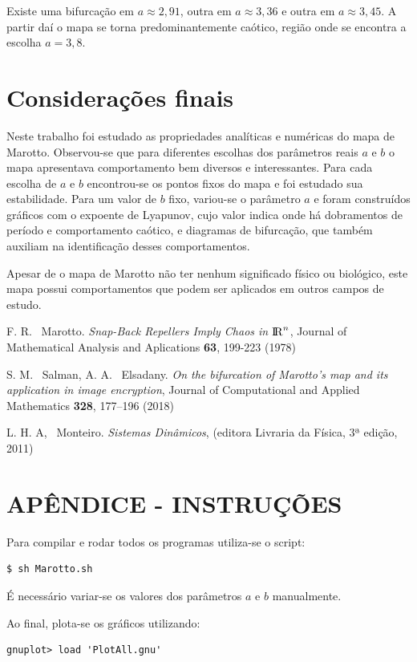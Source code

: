 \documentclass[brazilian, 12pt, a4paper, final]{article}
\begin{document}
\begin{multicols*}{2}
Existe uma bifurcação em $a\approx2,91$, outra em $a\approx3,36$ e outra em $a\approx3,45$. A partir daí o mapa se torna predominantemente caótico, região onde se encontra a escolha $a=3,8$.

\section{Considerações finais}

Neste trabalho foi estudado as propriedades analíticas e numéricas do mapa de Marotto. Observou-se que para diferentes escolhas dos parâmetros reais $a$ e $b$ o mapa apresentava comportamento bem diversos e interessantes. Para cada escolha de $a$ e $b$ encontrou-se os pontos fixos do mapa e foi estudado sua estabilidade. Para um valor de $b$ fixo, variou-se o parâmetro $a$ e foram construídos gráficos com o expoente de Lyapunov, cujo valor indica onde há dobramentos de período e comportamento caótico, e diagramas de bifurcação, que também auxiliam na identificação desses comportamentos.

Apesar de o mapa de Marotto não ter nenhum significado físico ou biológico, este mapa possui comportamentos que podem ser aplicados em outros campos de estudo.
 
\begin{thebibliography}{n}
  F. R. ~Marotto. {\em Snap-Back Repellers Imply Chaos in ${\rm I\!R}^{n}$}, Journal of Mathematical Analysis and Aplications {\bf 63}, 199-223 (1978)
 
 S. M. ~Salman, A. A. ~Elsadany. {\em On the bifurcation of Marotto’s map and its application in image encryption}, Journal of Computational and Applied Mathematics {\bf 328}, 177–196 (2018)

 L. H. A, ~Monteiro. {\em Sistemas Dinâmicos}, (editora Livraria da Física, 3ª edição, 2011)
  
\end{thebibliography}
\end{multicols*}

\appendix
\section{APÊNDICE - INSTRUÇÕES}

Para compilar e rodar todos os programas utiliza-se o script:
\begin{verbatim}
$ sh Marotto.sh
\end{verbatim}
É necessário variar-se os valores dos parâmetros $a$ e $b$ manualmente.

Ao final, plota-se os gráficos utilizando:
\begin{verbatim}
gnuplot> load 'PlotAll.gnu'
\end{verbatim}
\end{document}
